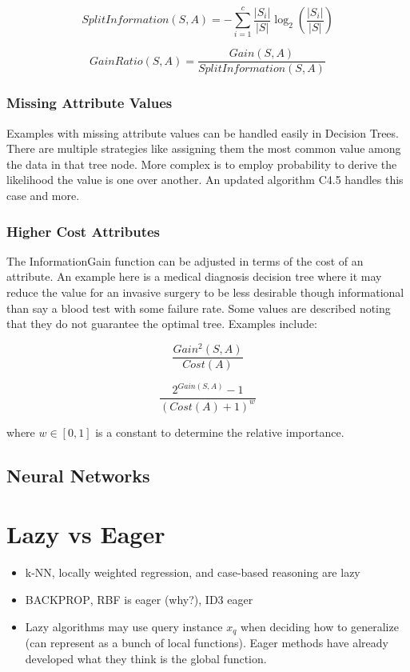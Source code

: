 \documentclass[11pt]{article}
\begin{document}
\begin{equation}
SplitInformation(S,A) = -\sum_{i=1}^{c} \frac{|S_i|}{|S|} \log_2(\frac{|S_i|}{|S|})
\end{equation}

\begin{equation}
GainRatio(S,A) = \frac{Gain(S, A)}{SplitInformation(S, A)}
\end{equation}

\subsubsection*{Missing Attribute Values}

Examples with missing attribute values can be handled easily in Decision Trees. There are multiple strategies like assigning them the most common value among the data in that tree node. More complex is to employ probability to derive the likelihood the value is one over another. An updated algorithm C4.5 handles this case and more.

\subsubsection*{Higher Cost Attributes}

The InformationGain function can be adjusted in terms of the cost of an attribute. An example here is a medical diagnosis decision tree where it may reduce the value for an invasive surgery to be less desirable though informational than say a blood test with some failure rate. Some values are described noting that they do not guarantee the optimal tree. Examples include:

\begin{equation}
\frac{Gain^2(S, A)}{Cost(A)}
\end{equation}

\begin{equation}
\frac{2^{Gain(S, A)} - 1}{(Cost(A) + 1)^w}
\end{equation}

where $w \in [0, 1]$ is a constant to determine the relative importance.

\subsection{Neural Networks}

\section{Lazy vs Eager}
\begin{itemize}
\item k-NN, locally weighted regression, and case-based reasoning are lazy
\item \textsc{BACKPROP}, RBF is eager (why?), ID3 eager
\item Lazy algorithms may use query instance $x_q$ when deciding how to generalize (can represent as a bunch of local functions). Eager methods have already developed what they think is the global function.
\end{itemize}
\end{document}
